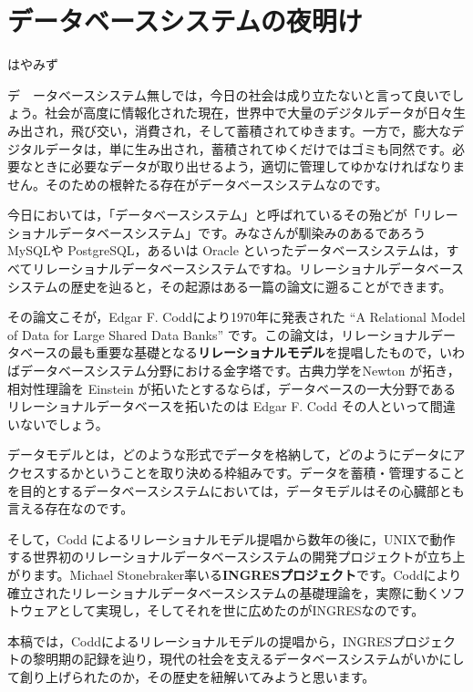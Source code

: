 

\cleardoublepage
\plainifnotempty


\chapter{データベースシステムの夜明け}


\begin{flushright}
はやみず
\end{flushright}


\lettrine{デ} \ \ ータベースシステム無しでは，今日の社会は成り立たないと言って良いでしょう。社会が高度に情報化された現在，世界中で大量のデジタルデータが日々生み出され，飛び交い，消費され，そして蓄積されてゆきます。一方で，膨大なデジタルデータは，単に生み出され，蓄積されてゆくだけではゴミも同然です。必要なときに必要なデータが取り出せるよう，適切に管理してゆかなければなりません。そのための根幹たる存在がデータベースシステムなのです。


今日においては，「データベースシステム」と呼ばれているその殆どが「リレーショナルデータベースシステム」です。みなさんが馴染みのあるであろう MySQLや PostgreSQL，あるいは Oracle といったデータベースシステムは，すべてリレーショナルデータベースシステムですね。リレーショナルデータベースシステムの歴史を辿ると，その起源はある一篇の論文に遡ることができます。


その論文こそが，Edgar F.  Coddにより1970年に発表された ``A Relational Model of Data for Large Shared Data Banks'' です。この論文は，リレーショナルデータベースの最も重要な基礎となる{\bf リレーショナルモデル}を提唱したもので，いわばデータベースシステム分野における金字塔です。古典力学をNewton が拓き，相対性理論を Einstein が拓いたとするならば，データベースの一大分野であるリレーショナルデータベースを拓いたのは Edgar F. Codd その人といって間違いないでしょう。


データモデルとは，どのような形式でデータを格納して，どのようにデータにアクセスするかということを取り決める枠組みです。データを蓄積・管理することを目的とするデータベースシステムにおいては，データモデルはその心臓部とも言える存在なのです。


そして，Codd によるリレーショナルモデル提唱から数年の後に，UNIXで動作する世界初のリレーショナルデータベースシステムの開発プロジェクトが立ち上がります。Michael Stonebraker率いる{\bf INGRESプロジェクト}です。Coddにより確立されたリレーショナルデータベースシステムの基礎理論を，実際に動くソフトウェアとして実現し，そしてそれを世に広めたのがINGRESなのです。


本稿では，Coddによるリレーショナルモデルの提唱から，INGRESプロジェクトの黎明期の記録を辿り，現代の社会を支えるデータベースシステムがいかにして創り上げられたのか，その歴史を紐解いてみようと思います。



